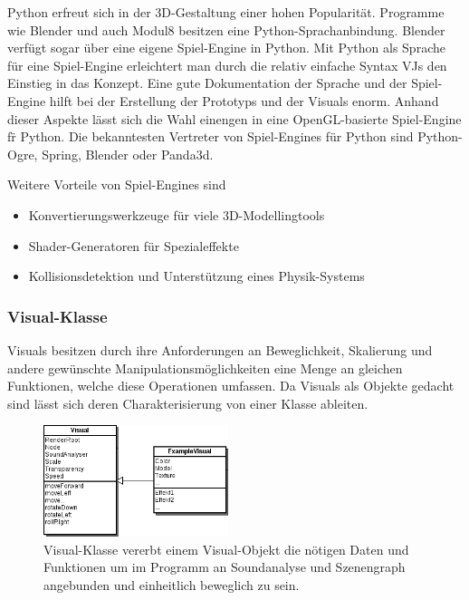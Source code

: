 Python erfreut sich in der 3D-Gestaltung einer hohen Popularit\"at. Programme wie Blender und auch Modul8 besitzen eine
Python-Sprachanbindung. Blender verf\"ugt sogar \"uber eine eigene Spiel-Engine in Python. Mit Python als Sprache f\"ur
eine Spiel-Engine erleichtert man durch die relativ einfache Syntax VJs den Einstieg in das Konzept. Eine gute Dokumentation
der Sprache und der Spiel-Engine hilft bei der Erstellung der Prototyps und der Visuals enorm. Anhand dieser Aspekte
l\"asst sich die Wahl einengen in eine OpenGL-basierte Spiel-Engine f\"r Python. Die bekanntesten Vertreter von
Spiel-Engines f\"ur Python sind Python-Ogre, Spring, Blender oder Panda3d.

Weitere Vorteile von Spiel-Engines sind
\begin{itemize}
    \item Konvertierungswerkzeuge f\"ur viele 3D-Modellingtools
    \item Shader-Generatoren f\"ur Spezialeffekte
    \item Kollisionsdetektion und Unterst\"utzung eines Physik-Systems
\end{itemize}



\subsubsection{Visual-Klasse}

Visuals besitzen durch ihre Anforderungen an Beweglichkeit, Skalierung und andere gew\"unschte Manipulationsm\"oglichkeiten
eine Menge an gleichen Funktionen, welche diese Operationen umfassen. Da Visuals als Objekte gedacht sind l\"asst sich deren
Charakterisierung von einer Klasse ableiten.

\begin{figure}
    \begin{center}
        \includegraphics[width=0.48\textwidth]{pictures/visualclass1.png}
    \end{center}
    \caption{Visual-Klasse vererbt einem Visual-Objekt die n\"otigen Daten und Funktionen um im Programm an Soundanalyse
        und Szenengraph angebunden und einheitlich beweglich zu sein.}
\end{figure}

